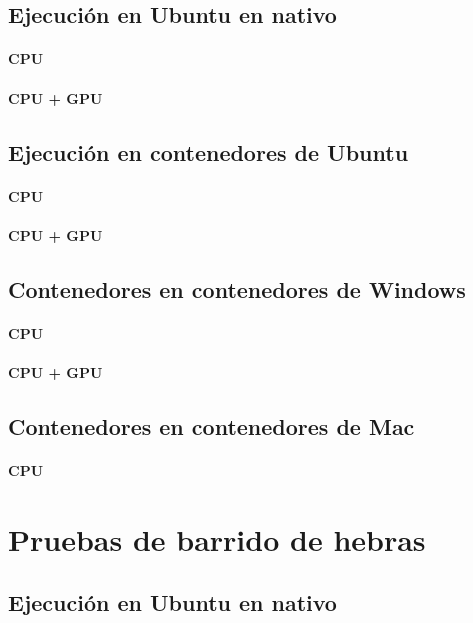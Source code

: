 \subsection{Ejecución en Ubuntu en nativo}
\paragraph{CPU}

\paragraph{CPU + GPU}

\subsection{Ejecución en contenedores de Ubuntu}
\paragraph{CPU}

\paragraph{CPU + GPU}

\subsection{Contenedores en contenedores de Windows}
\paragraph{CPU}

\paragraph{CPU + GPU}

\subsection{Contenedores en contenedores de Mac}
\paragraph{CPU}

\section{Pruebas de barrido de hebras}
\subsection{Ejecución en Ubuntu en nativo}
